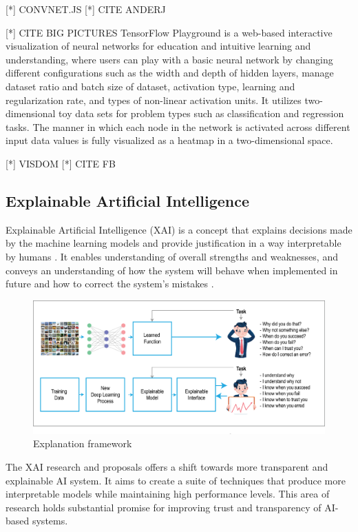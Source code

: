 [*] CONVNET.JS [*] CITE ANDERJ

[*] CITE BIG PICTURES
TensorFlow Playground is a web-based interactive visualization of neural networks for education and intuitive learning and understanding, where users can play with a basic neural network by changing different configurations such as the width and depth of hidden layers, manage dataset ratio and batch size of dataset, activation type, learning and regularization rate, and types of non-linear activation units. It utilizes two-dimensional toy data sets for problem types such as classification and regression tasks. The manner in which each node in the network is activated across different input data values is fully visualized as a heatmap in a two-dimensional space.

[*] VISDOM
[*] CITE FB
\subsection{Explainable Artificial Intelligence}
Explainable Artificial Intelligence (XAI) is a concept that explains decisions made by the machine learning models and provide justification in a way interpretable by humans \cite{Gunning}. It enables understanding of overall strengths and weaknesses, and conveys an understanding of how the system will behave when implemented in future and how to correct the system’s mistakes \cite{Gunning}.

\begin{figure}[htbp]
\centering
\includegraphics[width=1\textwidth]{images/XAI-concept-copy.eps}
\caption{Explanation framework}
\label{fig:Explanation framework}
\end{figure}

The XAI research and proposals offers a shift towards more transparent and explainable AI system. It aims to create a suite of techniques that produce more interpretable models while maintaining high performance levels. This area of research holds substantial promise for improving trust and transparency of AI-based systems.


